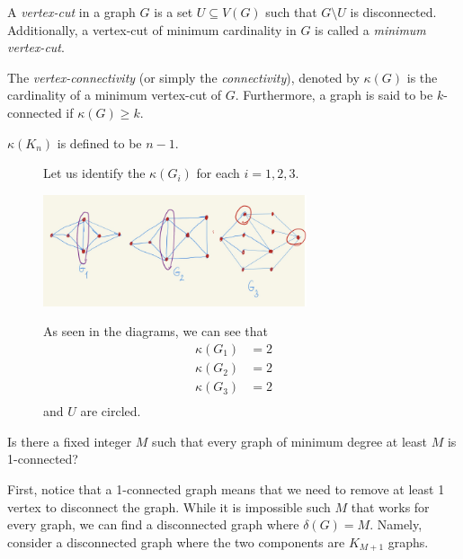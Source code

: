 \begin{definition}
  A \textit{vertex-cut} in a graph \(G\) is a set \(U \subseteq
  V(G)\) such that \(G \setminus U\) is disconnected.
  Additionally, a vertex-cut of minimum cardinality in \(G\) is
  called a \textit{minimum vertex-cut}.
\end{definition}

\begin{definition}
  The \textit{vertex-connectivity} (or simply the
  \textit{connectivity}), denoted by \(\kappa(G)\) is the
  cardinality of a minimum vertex-cut of \(G\). Furthermore, a
  graph is said to be \(k\)-connected if \(\kappa(G) \geq k\).
\end{definition}

\begin{remark}
  \(\kappa(K_n)\) is defined to be \(n-1\).
\end{remark}

\begin{figure}[ht]
\begin{nexample}
  Let us identify the \(\kappa(G_i)\) for each \(i=1, 2, 3\).

  \begin{center}
    \includegraphics[width=0.69\textwidth]{figures/l09/vertex-connectivity-example}
  \end{center}

  As seen in the diagrams, we can see that
  \[
    \begin{aligned}
      \kappa(G_1) &= 2 \\ 
      \kappa(G_2) &= 2 \\
      \kappa(G_3) &= 2 \\
    \end{aligned}
  \]
  and \(U\) are circled.
\end{nexample}
\end{figure}

\begin{nexample}
  Is there a fixed integer \(M\) such that every graph of minimum
  degree at least \(M\) is 1-connected?

  First, notice that a 1-connected graph means that we need to
  remove at least 1 vertex to disconnect the graph. While it is
  impossible such \(M\) that works for every graph, we can find a
  disconnected graph where \(\delta(G) = M\). Namely, consider a
  disconnected graph where the two components are \(K_{M+1}\)
  graphs.
\end{nexample}
